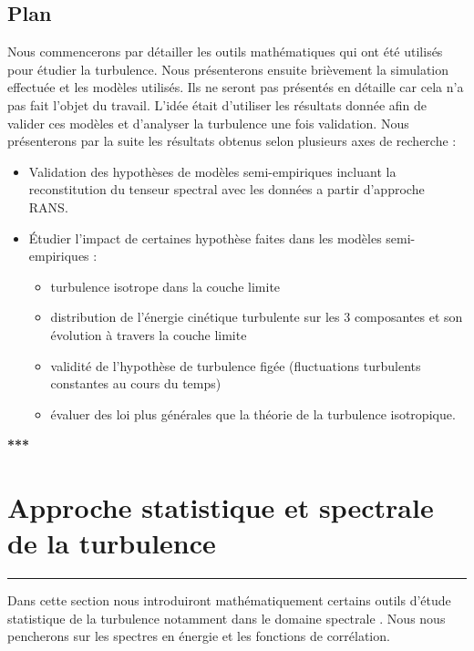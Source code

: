 \documentclass[12pt]{article}
\theoremstyle{plain}
\theoremstyle{remark}
\begin{document}
	\subsection{Plan}
	Nous commencerons par détailler les outils mathématiques qui ont été utilisés pour étudier la turbulence. Nous présenterons ensuite brièvement la simulation effectuée et les modèles utilisés. Ils ne seront pas présentés en détaille car cela n'a pas fait l'objet du travail. L'idée était d'utiliser les résultats donnée afin de valider ces modèles et d'analyser la turbulence une fois validation. Nous présenterons par la suite les résultats obtenus selon plusieurs axes de recherche : 
	\begin{itemize}
		\item Validation des hypothèses de modèles semi-empiriques incluant la reconstitution du tenseur spectral avec les données a partir d'approche RANS.
		\item Étudier l'impact de certaines hypothèse faites dans les modèles semi-empiriques : 
		\begin{itemize}
			\item turbulence isotrope dans la couche limite
			\item distribution de l'énergie cinétique turbulente sur les 3 composantes et son évolution à travers la couche limite
			\item validité de l'hypothèse de turbulence figée (fluctuations turbulents constantes au cours du temps)
			\item évaluer des loi plus générales que la théorie de la turbulence isotropique.
		\end{itemize}
	\end{itemize}

\begin{center}
	\large {\bf{***}}
\end{center}

\vspace{0.3cm}
\section{Approche statistique et spectrale de la turbulence}
\noindent\rule{\linewidth}{2pt}
\vspace{0.1cm}

	Dans cette section nous introduiront mathématiquement certains outils d'étude statistique de la turbulence notamment dans le domaine spectrale . Nous nous pencherons sur les spectres en énergie et les fonctions de corrélation.
	
\end{document}
